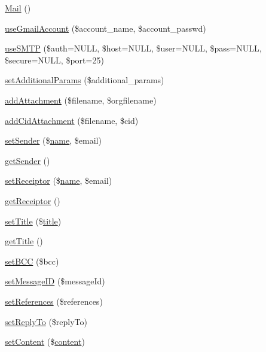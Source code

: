 \begin{DoxyCompactItemize}
\item 
\hyperlink{classMail_acd3d916cd6a769cdaf6e91dbc2c85699}{Mail} ()
\item 
\hyperlink{classMail_aa6094205d902ff01c7b0828f0e5e3221}{use\+Gmail\+Account} (\$account\+\_\+name, \$account\+\_\+passwd)
\item 
\hyperlink{classMail_a73ddc444b256378acb00373e9ac3171e}{use\+S\+M\+TP} (\$auth=N\+U\+LL, \$host=N\+U\+LL, \$user=N\+U\+LL, \$pass=N\+U\+LL, \$secure=N\+U\+LL, \$port=25)
\item 
\hyperlink{classMail_abea35dd9f29bbebacfc79ec2c7852799}{set\+Additional\+Params} (\$additional\+\_\+params)
\item 
\hyperlink{classMail_a318b203a297cfd20179ffe85a6fd7394}{add\+Attachment} (\$filename, \$orgfilename)
\item 
\hyperlink{classMail_ac926ab20cda232c4656a64eaf02a4ab4}{add\+Cid\+Attachment} (\$filename, \$cid)
\item 
\hyperlink{classMail_a13ed057003fa15b778da2a30ee7cb59f}{set\+Sender} (\$\hyperlink{common_8js_a22c29d2aa8ed6161ce8faa718ef76e68}{name}, \$email)
\item 
\hyperlink{classMail_a25c8d959a398cdfe3919d9fd634358d7}{get\+Sender} ()
\item 
\hyperlink{classMail_aa1ffe38b98a8d9eb618133c3dff48f90}{set\+Receiptor} (\$\hyperlink{common_8js_a22c29d2aa8ed6161ce8faa718ef76e68}{name}, \$email)
\item 
\hyperlink{classMail_ae334a42923b5cd5d4c7012ba944c3841}{get\+Receiptor} ()
\item 
\hyperlink{classMail_a1762e37387d9875d12977a5395bca29d}{set\+Title} (\$\hyperlink{ko_8install_8php_a5b072c5fd1d2228c6ba5cee13cd142e3}{title})
\item 
\hyperlink{classMail_aa03664254d34901e8545fa3725224e92}{get\+Title} ()
\item 
\hyperlink{classMail_a13267ee2cbaef851020cb3bf833437e8}{set\+B\+CC} (\$bcc)
\item 
\hyperlink{classMail_a51becbf02e5e415277fa8f4049ece136}{set\+Message\+ID} (\$message\+Id)
\item 
\hyperlink{classMail_a82b9ee0a8e238eef4028d135936374c9}{set\+References} (\$references)
\item 
\hyperlink{classMail_a8c2b05357bfaf3cb8dc165fbd5c9d8e2}{set\+Reply\+To} (\$reply\+To)
\item 
\hyperlink{classMail_a2112ae431d2a140d8624b943cf0eace9}{set\+Content} (\$\hyperlink{classcontent}{content})

\end{DoxyCompactItemize}
